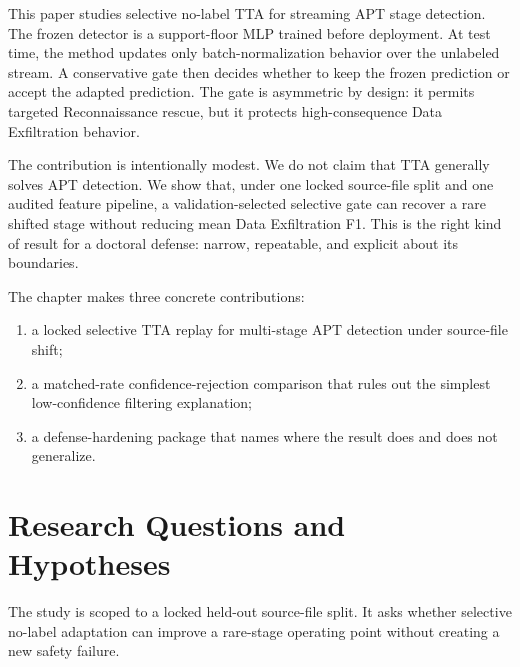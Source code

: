 \documentclass[10pt]{article}
\begin{document}
This paper studies selective no-label TTA for streaming APT stage detection.
The frozen detector is a support-floor MLP trained before deployment.
At test time, the method updates only batch-normalization behavior over the unlabeled stream.
A conservative gate then decides whether to keep the frozen prediction or accept the adapted prediction.
The gate is asymmetric by design: it permits targeted Reconnaissance rescue, but it protects high-consequence Data Exfiltration behavior.

The contribution is intentionally modest.
We do not claim that TTA generally solves APT detection.
We show that, under one locked source-file split and one audited feature pipeline, a validation-selected selective gate can recover a rare shifted stage without reducing mean Data Exfiltration F1.
This is the right kind of result for a doctoral defense: narrow, repeatable, and explicit about its boundaries.

The chapter makes three concrete contributions:
\begin{enumerate}[leftmargin=*]
  \item a locked selective TTA replay for multi-stage APT detection under source-file shift;
  \item a matched-rate confidence-rejection comparison that rules out the simplest low-confidence filtering explanation;
  \item a defense-hardening package that names where the result does and does not generalize.
\end{enumerate}

\section{Research Questions and Hypotheses}

The study is scoped to a locked held-out source-file split.
It asks whether selective no-label adaptation can improve a rare-stage operating point without creating a new safety failure.
\end{document}

